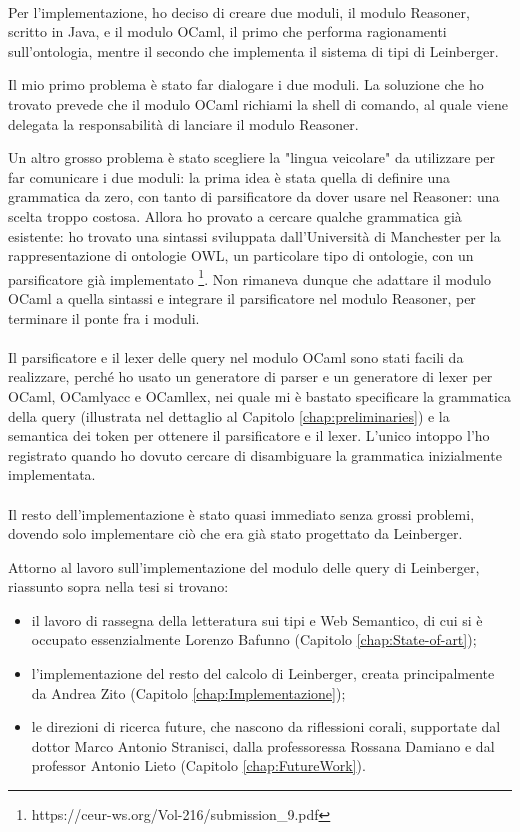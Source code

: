 \paragraph{} Per l'implementazione, ho deciso di creare due moduli, il modulo Reasoner, scritto in Java, e il modulo OCaml, il primo che performa ragionamenti sull'ontologia, mentre il secondo che implementa il sistema di tipi di Leinberger.

Il mio primo problema è stato far dialogare i due moduli. La soluzione che ho trovato prevede che il modulo OCaml richiami la shell di comando, al quale viene delegata la responsabilità di lanciare il modulo Reasoner.

Un altro grosso problema è stato scegliere la "lingua veicolare" da utilizzare per far comunicare i due moduli: la prima idea è stata quella di definire una grammatica da zero, con tanto di parsificatore da dover usare nel Reasoner: una scelta troppo costosa. Allora ho provato a cercare qualche grammatica già esistente: ho trovato una sintassi sviluppata dall'Università di Manchester per la rappresentazione di ontologie OWL, un particolare tipo di ontologie, con un parsificatore già implementato \footnote{https://ceur-ws.org/Vol-216/submission_9.pdf}. Non rimaneva dunque che adattare il modulo OCaml a quella sintassi e integrare il parsificatore nel modulo Reasoner, per terminare il ponte fra i moduli.

\paragraph{} Il parsificatore e il lexer delle query nel modulo OCaml sono stati facili da realizzare, perché ho usato un generatore di parser e un generatore di lexer per OCaml, OCamlyacc e OCamllex, nei quale mi è bastato specificare la grammatica della query (illustrata nel dettaglio al Capitolo \ref{chap:preliminaries}) e la semantica dei token per ottenere il parsificatore e il lexer. L'unico intoppo l'ho registrato quando ho dovuto cercare di disambiguare la grammatica inizialmente implementata. 

\paragraph{} Il resto dell'implementazione è stato quasi immediato senza grossi problemi, dovendo solo implementare ciò che era già stato progettato da Leinberger.

Attorno al lavoro sull'implementazione del modulo delle query di Leinberger, riassunto sopra nella tesi si trovano:
\begin{itemize}
\item il lavoro di rassegna della letteratura sui tipi e Web Semantico, di cui si è occupato essenzialmente Lorenzo Bafunno (Capitolo \ref{chap:State-of-art});
\item l'implementazione del resto del calcolo di Leinberger, creata principalmente da Andrea Zito (Capitolo \ref{chap:Implementazione});
\item le direzioni di ricerca future, che nascono da riflessioni corali, supportate dal dottor Marco Antonio Stranisci, dalla professoressa Rossana Damiano e dal professor Antonio Lieto (Capitolo \ref{chap:FutureWork}).
\end{itemize}